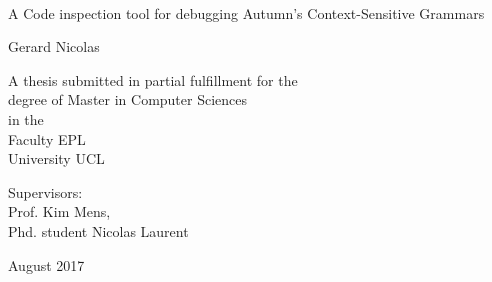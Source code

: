 \documentclass[11pt,a4paper,oldfontcommands]{memoir}
\begin{document}
%
%
\thispagestyle{empty}

{%
\sffamily
\centering
\Large

~\vspace{\fill}

{\huge 
A Code inspection tool for debugging Autumn's Context-Sensitive Grammars
}

\vspace{2.5cm}

{\LARGE
Gerard Nicolas
}

\vspace{3.5cm}

A thesis submitted in partial fulfillment for the\\
degree of Master in Computer Sciences\\[1em]
in the\\[1em]
Faculty EPL\\
University UCL

\vspace{3.5cm}

Supervisors: \\Prof. Kim Mens, \\Phd. student Nicolas Laurent

\vspace{\fill}

August 2017

}%

\cleardoublepage

\begin{abstract}
The debuging process is a crutial part of the lifetime of any projects. Unfortunately general purpose debuggers cannot provide the level of abstraction needed to reason efficiently on grammar developpement related errors.

We introduce a debugging tool to Autumn context-sensitive grammar. The goal is to provide the developpers with a tool that expose high level abstractions that represents the structure he reason about more closely, allowing him to track errors and resolve them more easily.
\end{abstract}

\cleardoublepage
\end{document}
